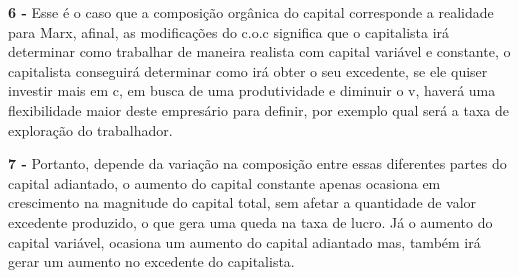 \documentclass[a4paper, 12pt]{article} %
\begin{document}
\vspace{0.5cm}

\par \textbf{6 -} Esse é o caso que a composição orgânica do capital corresponde a realidade para Marx, afinal, as modificações do c.o.c significa que o capitalista irá determinar como trabalhar de maneira realista com capital variável e constante, o capitalista conseguirá determinar como irá obter o seu excedente, se ele quiser investir mais em c, em busca de uma produtividade e diminuir o v, haverá uma flexibilidade maior deste empresário para definir, por exemplo qual será a taxa de exploração do trabalhador.

\vspace{0.5cm}

\par \textbf{7 -} Portanto, depende da variação na composição entre essas diferentes partes do capital adiantado, o aumento do capital constante apenas ocasiona em crescimento na magnitude do capital total, sem afetar a quantidade de valor excedente produzido, o que gera uma queda na taxa de lucro. Já o aumento do capital variável, ocasiona um aumento do capital adiantado mas, também irá gerar um aumento no excedente do capitalista.
\end{document}
